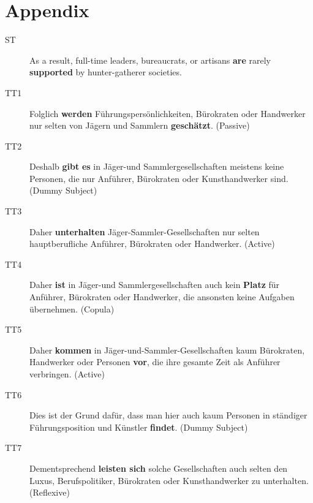 \documentclass[output=paper]{LSP/langsci}
\begin{document}
\section*{Appendix}
\begin{description}
\item[ST] As a result, full-time leaders, bureaucrats, or artisans \textbf{are} rarely \textbf{supported} by hunter-gatherer societies. 
\item[TT1] Folglich \textbf{werden} Führungspersönlichkeiten, Bürokraten oder Handwerker nur selten von Jägern und Sammlern \textbf{geschätzt}. (Passive)
\item[TT2] Deshalb \textbf{gibt} \textbf{es} in Jäger-und Sammlergesellschaften meistens keine Personen, die nur Anführer, Bürokraten oder Kunsthandwerker sind. (Dummy Subject)
\item[TT3] Daher \textbf{unterhalten} Jäger-Sammler-Gesellschaften nur selten hauptberuf\-li\-che Anführer, Bürokraten oder Hand\-werker. (Active)
\item[TT4] Daher \textbf{ist} in Jäger-und Sammlergesellschaften auch kein\textbf{ Platz} für Anführer, Bürokraten oder Hand\-werker, die ansonsten keine Aufgaben übernehmen. (Copula)
\item[TT5] \sloppy Daher \textbf{kommen} in Jäger-und-Sammler-Gesellschaften kaum Bürokraten, Hand\-werker oder Personen \textbf{vor}, die ihre gesamte Zeit als Anführer verbringen. (Active)
\item[TT6] Dies ist der Grund dafür, dass man hier auch kaum Personen in ständiger Führungsposition und Künstler \textbf{findet}. (Dummy Subject)
\item[TT7] Dementsprechend \textbf{leisten sich} solche Gesellschaften auch selten den Luxus, Berufspolitiker, Bürokraten oder Kunsthandwerker zu unterhalten. (Reflexive)
\end{description}

\sloppy
\printbibliography[heading=subbibliography,notkeyword=this]
\end{document}
